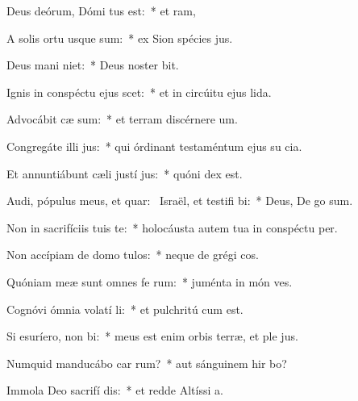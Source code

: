 \item Deus deórum, Dómi tus est:~* et  ram,
\item A solis ortu usque  sum:~* ex Sion spécies  jus.
\item Deus mani niet:~* Deus noster   bit.
\item Ignis in conspéctu ejus scet:~* et in circúitu ejus  lida.
\item Advocábit cæ sum:~* et terram discérnere  um.
\item Congregáte illi  jus:~* qui órdinant testaméntum ejus su cia.
\item Et annuntiábunt cæli justí jus:~* quóni  dex est.
\item Audi, pópulus meus, et quar:~\pscross{} Israël, et testifi bi:~* Deus, De  go sum.
\item Non in sacrifíciis tuis  te:~* holocáusta autem tua in conspéctu   per.
\item Non accípiam de domo  tulos:~* neque de grégi  cos.
\item Quóniam meæ sunt omnes fe rum:~* juménta in món  ves.
\item Cognóvi ómnia volatí li:~* et pulchritú  cum est.
\item Si esuríero, non  bi:~* meus est enim orbis terræ, et ple jus.
\item Numquid manducábo car rum?~* aut sánguinem hir bo?
\item Immola Deo sacrifí dis:~* et redde Altíssi  a.
